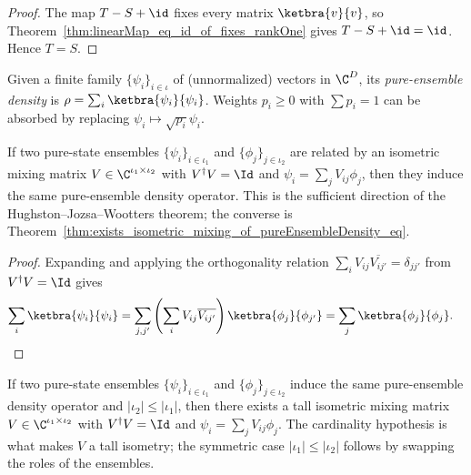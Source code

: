 \begin{proof}\leanok
    The map $T-S+\id$ fixes every matrix $\ketbra{v}{v}$, so
    Theorem~\ref{thm:linearMap_eq_id_of_fixes_rankOne} gives
    $T-S+\id=\id$. Hence $T=S$.
\end{proof}

\begin{definition}
    \label{def:pureEnsembleDensity}
    \leanok
    Given a finite family $\{\psi_i\}_{i \in \iota}$ of (unnormalized)
    vectors in $\C^D$, its \emph{pure-ensemble density} is
    $\rho = \sum_i \ketbra{\psi_i}{\psi_i}$. Weights
    $p_i \geq 0$ with $\sum p_i = 1$ can be absorbed by replacing
    $\psi_i \mapsto \sqrt{p_i} \psi_i$.
\end{definition}

\begin{theorem}
    \label{thm:pureEnsembleDensity_eq_of_isometric_mixing}
    \leanok
    If two pure-state ensembles $\{\psi_i\}_{i \in \iota_1}$ and
    $\{\phi_j\}_{j \in \iota_2}$ are related by an isometric mixing
    matrix $V \in \C^{\iota_1 \times \iota_2}$ with
    $V^\dagger V = \Id$ and $\psi_i = \sum_j V_{ij} \phi_j$, then
    they induce the same pure-ensemble density operator. This is the
    sufficient direction of the Hughston--Jozsa--Wootters theorem; the
    converse is Theorem~\ref{thm:exists_isometric_mixing_of_pureEnsembleDensity_eq}.
\end{theorem}

\begin{proof}
    \leanok
    Expanding and applying the orthogonality relation
    $\sum_i V_{ij}\overline{V_{ij'}} = \delta_{j j'}$ from
    $V^\dagger V = \Id$ gives
    \begin{align}
        \sum_i \ketbra{\psi_i}{\psi_i}
        &= \sum_{j, j'} \left(\sum_i V_{ij} \overline{V_{ij'}}\right)
        \ketbra{\phi_j}{\phi_{j'}}
        = \sum_j \ketbra{\phi_j}{\phi_j}.
        \notag
    \end{align}
\end{proof}

\begin{theorem}
    \label{thm:exists_isometric_mixing_of_pureEnsembleDensity_eq}
    \leanok
    If two pure-state ensembles $\{\psi_i\}_{i \in \iota_1}$ and
    $\{\phi_j\}_{j \in \iota_2}$ induce the same pure-ensemble density
    operator and $|\iota_2| \le |\iota_1|$, then there exists a tall
    isometric mixing matrix
    $V \in \C^{\iota_1 \times \iota_2}$ with
    $V^\dagger V = \Id$ and $\psi_i = \sum_j V_{ij} \phi_j$. The
    cardinality hypothesis is what makes $V$ a tall isometry; the
    symmetric case $|\iota_1| \le |\iota_2|$ follows by swapping the
    roles of the ensembles.
\end{theorem}

